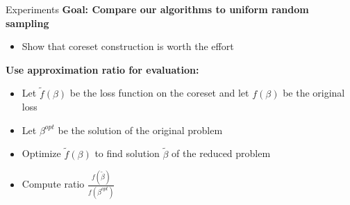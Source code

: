\documentclass[gray]{beamer}
\begin{document}
\begin{frame}{Experiments} \pause
    \textbf{Goal: Compare our algorithms to uniform random sampling}
    \begin{itemize}
        \item Show that coreset construction is worth the effort
    \end{itemize}

    \pause

    \vspace{\fill}

    \textbf{Use approximation ratio for evaluation:}
    \begin{itemize}
        \item Let $\tilde{f}(\beta)$ be the loss function on the coreset
              and let $f(\beta)$ be the original loss
        \item Let $\beta^{opt}$ be the solution of the original problem
        \item Optimize $\tilde{f}(\beta)$ to find solution $\tilde{\beta}$
              of the reduced problem
        \item Compute ratio $\frac{f(\tilde{\beta})}{f(\beta^{opt})}$
    \end{itemize}
\end{frame}
\end{document}
